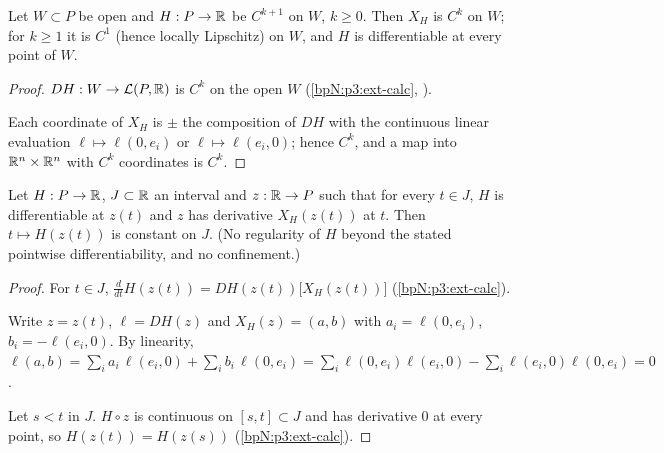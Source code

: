 \begin{lemma}[Regularity of $X_H$]\label{bpN:p3:ham-smooth}
Let $W\subset P$ be open and $H:P\to\mathbb{R}$ be $C^{k+1}$ on $W$, $k\ge0$. Then $X_H$ is $C^k$ on $W$; for $k\ge1$ it is $C^1$
(hence locally Lipschitz) on $W$, and $H$ is differentiable at every point of $W$.
\end{lemma}
\begin{proof}
\label{stepN:p3:hs-deriv} $DH:W\to\mathcal L(P,\mathbb{R})$ is $C^k$ on the open $W$ (\ref{bpN:p3:ext-calc}, ).

\label{stepN:p3:hs-comp} Each coordinate of $X_H$ is $\pm$ the composition of $DH$ with the continuous linear evaluation $\ell\mapsto\ell(0,e_i)$ or $\ell\mapsto\ell(e_i,0)$; hence $C^k$, and a map into $\mathbb{R}^n\times\mathbb{R}^n$ with $C^k$ coordinates is $C^k$.
\end{proof}

\begin{theorem}\label{bpN:p3:ham-energy}
Let $H:P\to\mathbb{R}$, $J\subset\mathbb{R}$ an interval and $z:\mathbb{R}\to P$ such that for every $t\in J$, $H$ is differentiable at $z(t)$
and $z$ has derivative $X_H(z(t))$ at $t$. Then $t\mapsto H(z(t))$ is constant on $J$.
(No regularity of $H$ beyond the stated pointwise differentiability, and no confinement.)
\end{theorem}
\begin{proof}
\label{stepN:p3:en-chain} For $t\in J$, $\frac{d}{dt}H(z(t))=DH(z(t))\bigl[X_H(z(t))\bigr]$ (\ref{bpN:p3:ext-calc}).

\label{stepN:p3:en-cancel} Write $z=z(t)$, $\ell=DH(z)$ and $X_H(z)=(a,b)$ with $a_i=\ell(0,e_i)$, $b_i=-\ell(e_i,0)$. By linearity, $\ell(a,b)=\sum_ia_i\,\ell(e_i,0)+\sum_ib_i\,\ell(0,e_i)=\sum_i\ell(0,e_i)\ell(e_i,0)-\sum_i\ell(e_i,0)\ell(0,e_i)=0$.

\label{stepN:p3:en-const} Let $s<t$ in $J$. $H\circ z$ is continuous on $[s,t]\subset J$ and has derivative $0$ at every point, so $H(z(t))=H(z(s))$ (\ref{bpN:p3:ext-calc}).
\end{proof}

